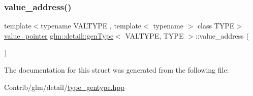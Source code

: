 \subsubsection{\texorpdfstring{value\+\_\+address()}{value\_address()}\hspace{0.1cm}{\footnotesize\ttfamily [2/2]}}
{\footnotesize\ttfamily template$<$typename V\+A\+L\+T\+Y\+PE , template$<$ typename $>$ class T\+Y\+PE$>$ \\
\mbox{\hyperlink{structglm_1_1detail_1_1gen_type_a3b272e7be29ab920f2877c00646f6f9b}{value\+\_\+pointer}} \mbox{\hyperlink{structglm_1_1detail_1_1gen_type}{glm\+::detail\+::gen\+Type}}$<$ V\+A\+L\+T\+Y\+PE, T\+Y\+PE $>$\+::value\+\_\+address (\begin{DoxyParamCaption}{ }\end{DoxyParamCaption})\hspace{0.3cm}{\ttfamily [inline]}}



The documentation for this struct was generated from the following file\+:\begin{DoxyCompactItemize}
\item 
Contrib/glm/detail/\mbox{\hyperlink{type__gentype_8hpp}{type\+\_\+gentype.\+hpp}}\end{DoxyCompactItemize}
